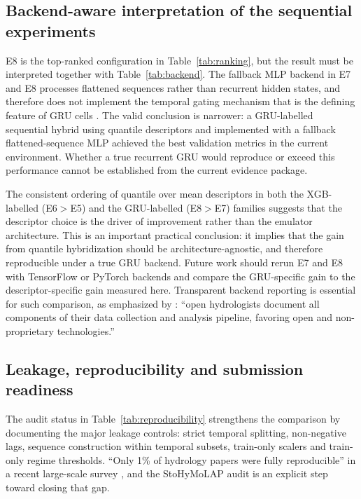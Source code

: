 \documentclass[a4paper,fleqn]{cas-sc}
\begin{document}
\subsection{Backend-aware interpretation of the sequential experiments}
\label{subsec:discussion-backend}

E8 is the top-ranked configuration in Table~\ref{tab:ranking}, but the
result must be interpreted together with Table~\ref{tab:backend}. The
fallback MLP backend in E7 and E8 processes flattened sequences rather
than recurrent hidden states, and therefore does not implement the
temporal gating mechanism that is the defining feature of GRU cells
\citep{cho2014gru,kratzert2018}. The valid conclusion is narrower:
a GRU-labelled sequential hybrid using quantile descriptors and
implemented with a fallback flattened-sequence MLP achieved the best
validation metrics in the current environment. Whether a true recurrent
GRU would reproduce or exceed this performance cannot be established
from the current evidence package.

The consistent ordering of quantile over mean descriptors in both the
XGB-labelled (E6$>$E5) and the GRU-labelled (E8$>$E7) families
suggests that the descriptor choice is the driver of improvement rather
than the emulator architecture. This is an important practical
conclusion: it implies that the gain from quantile hybridization should
be architecture-agnostic, and therefore reproducible under a true GRU
backend. Future work should rerun E7 and E8 with TensorFlow or PyTorch
backends and compare the GRU-specific gain to the descriptor-specific
gain measured here. Transparent backend reporting is essential for such
comparison, as emphasized by \citet{hall2021}: ``open hydrologists
document all components of their data collection and analysis pipeline,
favoring open and non-proprietary technologies.''

\subsection{Leakage, reproducibility and submission readiness}
\label{subsec:discussion-leakage}

The audit status in Table~\ref{tab:reproducibility} strengthens the
comparison by documenting the major leakage controls: strict temporal
splitting, non-negative lags, sequence construction within temporal
subsets, train-only scalers and train-only regime thresholds.
``Only 1\% of hydrology papers were fully reproducible'' in a recent
large-scale survey \citep{hall2021}, and the StoHyMoLAP audit is an
explicit step toward closing that gap.
\end{document}
